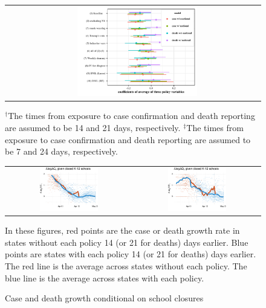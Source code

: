\documentclass[11pt,reqno,letter]{amsart}
\theoremstyle{definition}
\begin{document}
\begin{figure}[ht]
\begin{minipage}{\linewidth}
\begin{tabular}{cc}
      &
      \includegraphics[width=0.5\textwidth]{tables_and_figures/pindex-whisker-7}
          \end{tabular}
  \end{minipage}
    \begin{flushleft}
      \footnotesize
      $^\dagger$The times from exposure to case confirmation and death reporting  are assumed to be 14 and 21 days, respectively. $^\ddagger$The times from exposure to case confirmation and death reporting  are assumed to be 7 and 24 days, respectively.
    \end{flushleft}
\end{figure}


 \begin{figure}
  \caption{Case and death growth conditional on school closures \label{fig:growthpolicies-school}}
  \begin{minipage}{\linewidth}
    \centering
    \begin{tabular}{cc}
       \includegraphics[width=0.483\textwidth]{tables_and_figures/pk12-cases-14}
      &
        \includegraphics[width=0.483\textwidth]{tables_and_figures/pk12-deaths-21}
    \end{tabular}
      \footnotesize In these figures, red points are the case or death
      growth rate in states without each policy 14 (or 21 for deaths)
      days earlier. Blue points are states with each policy 14 (or 21
      for deaths) days earlier. The red line is the average across
      states without each policy. The blue line is the average across
      states with each policy.
  \end{minipage}
\end{figure}
\end{document}
